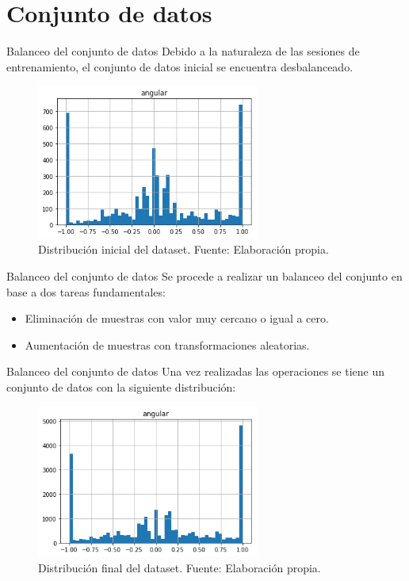 \documentclass[10pt]{beamer}
\begin{document}
\section*{Conjunto de datos}

\begin{frame}{Balanceo del conjunto de datos}
    Debido a la naturaleza de las sesiones de entrenamiento, el conjunto de datos inicial 
    se encuentra desbalanceado.
    \begin{figure}[!h] 
        \centering
        \includegraphics[width=0.65\textwidth]{../img/histinicial}
        \caption[Distribución inicial del dataset]{Distribución inicial del dataset. Fuente: Elaboración propia. }
        \label{fig:histinicial}
    \end{figure}
\end{frame}

\begin{frame}{Balanceo del conjunto de datos}
    Se procede a realizar un balanceo del conjunto en base a dos tareas fundamentales:
    \begin{itemize}
        \item Eliminación de muestras con valor muy cercano o igual a cero.
        \item Aumentación de muestras con transformaciones aleatorias.
    \end{itemize}
\end{frame}

\begin{frame}{Balanceo del conjunto de datos}
    Una vez realizadas las operaciones se tiene un conjunto de datos con la siguiente distribución:
    \begin{figure}[!h] 
        \centering
        \includegraphics[width=0.65\textwidth]{../img/histfinal}
        \caption[Distribución final del dataset]{Distribución final del dataset. Fuente: Elaboración propia. }
        \label{fig:histfinal}
    \end{figure}
\end{frame}
\end{document}
